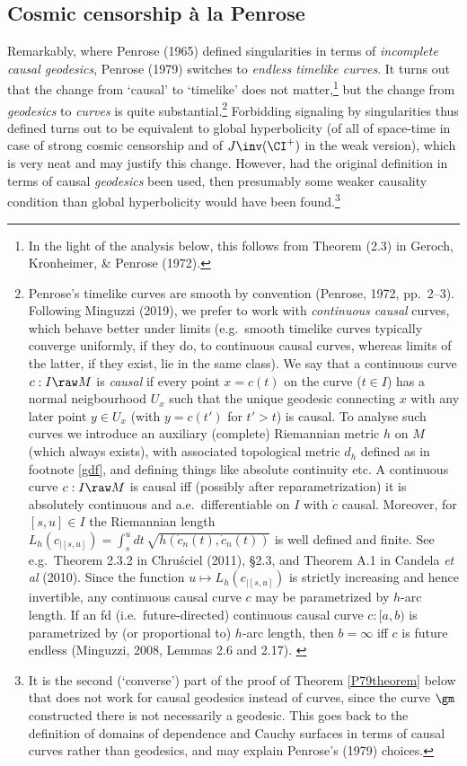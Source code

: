 \documentclass[11pt,a4paper]{article}
\begin{document}
 \subsection{Cosmic censorship \`{a} la Penrose}\label{PCCC}
 Remarkably, where Penrose (1965) defined singularities in terms of  \emph{incomplete causal geodesics}, 
  Penrose (1979) switches to  \emph{endless timelike curves}. It turns out that the change from `causal' to `timelike' does not matter,\footnote{In the light of the analysis below, this follows from Theorem (2.3) in  Geroch, Kronheimer, \&  Penrose (1972).} but the change from \emph{geodesics} to   \emph{curves} is quite substantial.\footnote{Penrose's timelike curves  are smooth  by convention (Penrose, 1972, pp.\ 2--3). Following Minguzzi (2019),  we prefer to work with \emph{continuous causal} curves, which behave better under limits (e.g.\ smooth timelike curves typically converge 
  uniformly, if they do, to continuous causal curves, whereas limits of the latter, if they exist, lie in the same class). 
 We say that a continuous curve $c:I\raw M$ is \emph{causal} if every point $x=c(t)$ on the curve ($t\in I$) has a normal neigbourhood  $U_x$  such that the unique geodesic  connecting $x$ with
 any later point $y\in U_x$ (with $y=c(t')$ for $t'>t$)  is causal. To analyse such curves we introduce an auxiliary (complete)  Riemannian metric $h$ on $M$ (which always exists), 
with associated topological metric $d_h$ defined as in footnote \ref{gdf}, and defining things like absolute continuity etc.
 A continuous curve $c:I\raw M$ is causal iff (possibly after reparametrization) it is absolutely continuous and a.e.\ differentiable on $I$ with $\dot{c}$ causal. Moreover,  for $[s,u]\in I$ the Riemannian length
$L_h(c_{|[s,u]})=\int_s^udt\, \sqrt{h(\dot{c}_n(t), \dot{c}_n(t))}$ is well defined and finite.  See e.g.\ Theorem 2.3.2 in  Chru\'{s}ciel (2011), \S 2.3, and Theorem A.1 in Candela \emph{et al} (2010).
Since the function $u\mapsto L_h(c_{|[s,u]})$ is strictly increasing and hence invertible, 
any continuous causal curve $c$ may  be parametrized by $h$-arc length.  If an fd (i.e.\ future-directed) continuous causal curve $c:[a,b)$ is parametrized by (or proportional to) $h$-arc length, then $b=\infty$ iff $c$ is future endless (Minguzzi, 2008, Lemmas 2.6 and 2.17). \label{hfn}} 
  Forbidding signaling by singularities thus defined turns out to be equivalent to global hyperbolicity (of all of space-time in case of strong cosmic censorship and of $J\inv(\CI^+)$ in the weak version), which is very neat and may justify this change. However, had the original definition in terms of causal \emph{geodesics}  been used, then presumably some weaker causality condition than global hyperbolicity would have been found.\footnote{It is the second (`converse') part of the proof of Theorem \ref{P79theorem} below that does not work for causal  geodesics instead of  curves, since the curve $\gm$ constructed there is not necessarily a geodesic. This goes back to the definition of domains of dependence and  Cauchy surfaces in terms of causal curves rather than geodesics, and may explain Penrose's (1979) choices. 
 }
 
\end{document}
